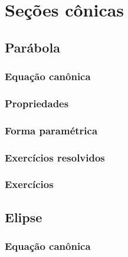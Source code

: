 
\chapter{Seções cônicas}\label{chap:conicas}

\emconstrucao

\section{Parábola}
\construirSec

\subsection{Equação canônica}
\construirSec

\subsection{Propriedades}
\construirSec

\subsection{Forma paramétrica}
\construirSec

\subsection*{Exercícios resolvidos}
\construirExeresol

\subsection*{Exercícios}
\construirExer

\section{Elipse}
\construirSec

\subsection{Equação canônica}
\construirSec

